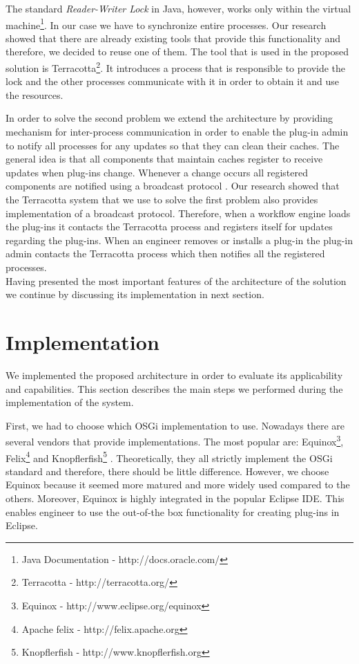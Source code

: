 The standard \textit{Reader-Writer Lock} in Java, however, works only within the virtual machine\footnote{Java Documentation - http://docs.oracle.com/}. In our case we have to synchronize entire processes. Our research showed that there are already existing tools that provide this functionality \cite{hernane2012dynamic} and therefore, we decided to reuse one of them. The tool that is used in the proposed solution is Terracotta\footnote{Terracotta - http://terracotta.org/}. It introduces a process that is responsible to provide the lock and the other processes communicate with it in order to obtain it and use the resources.

In order to solve the second problem we extend the architecture by providing mechanism for inter-process communication in order to enable the plug-in admin to notify all processes for any updates so that they can clean their caches. The general idea is that all components that maintain caches register to receive updates when plug-ins change. Whenever a change occurs all registered components are notified using a broadcast protocol \cite{joseph1988reliable}. Our research showed that the Terracotta system that we use to solve the first problem also provides implementation of a broadcast protocol. Therefore, when a workflow engine loads the plug-ins it contacts the Terracotta process and registers itself for updates regarding the plug-ins. When an engineer removes or installs a plug-in the plug-in admin contacts the Terracotta process which then notifies all the registered processes.\\

Having presented the most important features of the architecture of the solution we continue by discussing its implementation in next section. 


\section{Implementation}
\label{sec:implPlugin}

We implemented the proposed architecture in order to evaluate its applicability and capabilities. This section describes the main steps we performed during the implementation of the system.

First, we had to choose which OSGi implementation to use. Nowadays there are several vendors that provide implementations. The most popular are: Equinox\footnote{Equinox - http://www.eclipse.org/equinox}, Felix\footnote{Apache felix - http://felix.apache.org} and Knopflerfish\footnote{Knopflerfish - http://www.knopflerfish.org} \cite{tavares2008gentle}. Theoretically, they all strictly implement the OSGi standard and therefore, there should be little difference. However, we choose Equinox because it seemed more matured and more widely used compared to the others. Moreover, Equinox is highly integrated in the popular Eclipse IDE. This enables engineer to use the out-of-the box functionality for creating plug-ins in Eclipse.

